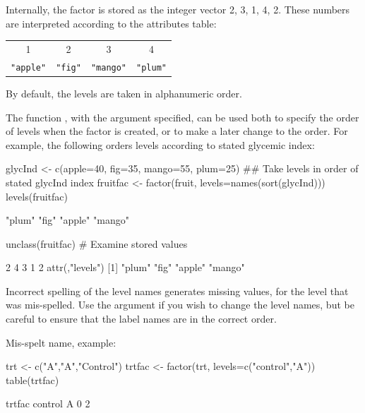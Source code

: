 Internally, the factor is stored
as the integer vector 2, 3, 1, 4, 2. These numbers are
interpreted according to the attributes table:\\[2mm]
\begin{tabular}{|cccc|}
\hline
1 & 2 & 3 & 4\\
\verb!"apple"! & \verb!"fig"! & \verb!"mango"! & \verb!"plum"!\\
\hline
\end{tabular}
\vspace*{8pt}

\noindent
By default, the levels are taken in alphanumeric order.

The function , with the  argument
specified, can be used both to specify the order of levels when the
factor is created, or to make a later change to the
order.  For example, the following
orders levels according to stated glycemic index:
\begin{Schunk}
\begin{Sinput}
glycInd <- c(apple=40, fig=35, mango=55, plum=25)
## Take levels in order of stated glycInd index
fruitfac <- factor(fruit,
                   levels=names(sort(glycInd)))
levels(fruitfac)
\end{Sinput}
\begin{Soutput}
[1] "plum"  "fig"   "apple" "mango"
\end{Soutput}
\begin{Sinput}
unclass(fruitfac)  # Examine stored values
\end{Sinput}
\begin{Soutput}
[1] 2 4 3 1 2
attr(,"levels")
[1] "plum"  "fig"   "apple" "mango"
\end{Soutput}
\end{Schunk}

Incorrect spelling of the level names generates missing values, for
the level that was mis-spelled.  Use the  argument if you
wish to change the level names, but be careful to ensure that the
label names are in the correct order.
\begin{marginfigure}[-36pt]
Mis-spelt name, example:
\begin{Schunk}
\begin{Sinput}
trt <- c("A","A","Control")
trtfac <- factor(trt,
  levels=c("control","A"))
table(trtfac)
\end{Sinput}
\begin{Soutput}
trtfac
control       A 
      0       2 
\end{Soutput}
\end{Schunk}
\end{marginfigure}

